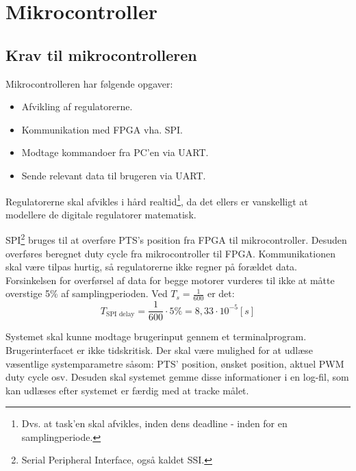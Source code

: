 \section{Mikrocontroller}
\label{sec:mikrocontroller}
%
\subsection{Krav til mikrocontrolleren}
Mikrocontrolleren har følgende opgaver: 

\begin{itemize}
\itemsep1pt
	\item Afvikling af regulatorerne.
	\item Kommunikation med FPGA vha. SPI.
	\item Modtage kommandoer fra PC'en via UART.
	\item Sende relevant data til brugeren via UART.
\end{itemize}

Regulatorerne skal afvikles i hård realtid\footnote{Dvs. at task'en skal afvikles, inden dens deadline - inden for en samplingperiode.},
da det ellers er vanskelligt at modellere de digitale regulatorer matematisk.

SPI\footnote{Serial Peripheral Interface, også kaldet SSI.} bruges til at overføre PTS's position fra FPGA til mikrocontroller.
Desuden overføres beregnet duty cycle fra mikrocontroller til FPGA.
Kommunikationen skal være tilpas hurtig, så regulatorerne ikke regner på forældet data.
Forsinkelsen for overførsel af data for begge motorer vurderes til ikke at måtte overstige 5\% af samplingperioden.
Ved $T_s = \frac{1}{600}$ er det: 
\begin{equation}
	T_{\text{SPI delay}} = \frac{1}{600} \cdot 5 \% = 8,33 \cdot 10^{-5}[s]
	\label{eq:uc:spi-krav}
\end{equation}

Systemet skal kunne modtage brugerinput gennem et terminalprogram.
Brugerinterfacet er ikke tidskritisk.
Der skal være mulighed for at udlæse væsentlige systemparametre såsom:
PTS' position, ønsket position, aktuel PWM duty cycle osv.
Desuden skal systemet gemme disse informationer i en log-fil,
som kan udlæses efter systemet er færdig med at tracke målet.

